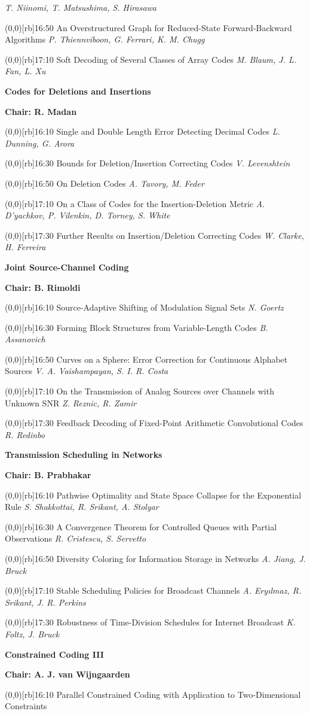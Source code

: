 \documentclass[a5paper,twoside]{article}
\def\sesstitle#1{\vspace{.45\bigskipamount}\par{\bfseries #1}\par}
\def\sesschair#1{{\bfseries Chair: #1}\par\vspace{.65\medskipamount}}
\def\papertime#1{\makebox(0,0)[rb]{{\scriptsize #1}\hspace{.5em}}}
\def\papertitle#1{#1\hfil\break}
\def\paperauthors#1{{\itshape #1}\par\filbreak\vspace{.65\medskipamount}}
\begin{document}
\paperauthors{T. Niinomi, T. Matsushima, S. Hirasawa}
\papertime{16:50}%
\papertitle{An Overstructured Graph for Reduced-State Forward-Backward Algorithms}
\paperauthors{P. Thiennviboon, G. Ferrari, K. M. Chugg}
\papertime{17:10}%
\papertitle{Soft Decoding of Several Classes of Array Codes}
\paperauthors{M. Blaum, J. L. Fan, L. Xu}
\sesstitle{Codes for Deletions and Insertions}
\sesschair{R. Madan}
\papertime{16:10}%
\papertitle{Single and Double Length Error Detecting Decimal Codes}
\paperauthors{L. Dunning, G. Arora}
\papertime{16:30}%
\papertitle{Bounds for Deletion/Insertion Correcting Codes}
\paperauthors{V. Levenshtein}
\papertime{16:50}%
\papertitle{On Deletion Codes}
\paperauthors{A. Tavory, M. Feder}
\papertime{17:10}%
\papertitle{On a Class of Codes for the Insertion-Deletion Metric}
\paperauthors{A. D'yachkov, P. Vilenkin, D. Torney, S. White}
\papertime{17:30}%
\papertitle{Further Results on Insertion/Deletion Correcting Codes}
\paperauthors{W. Clarke, H. Ferreira}
\sesstitle{Joint Source-Channel Coding}
\sesschair{B. Rimoldi}
\papertime{16:10}%
\papertitle{Source-Adaptive Shifting of Modulation Signal Sets}
\paperauthors{N. Goertz}
\papertime{16:30}%
\papertitle{Forming Block Structures from Variable-Length Codes}
\paperauthors{B. Assanovich}
\papertime{16:50}%
\papertitle{Curves on a Sphere: Error Correction for Continuous Alphabet Sources}
\paperauthors{V. A. Vaishampayan, S. I. R. Costa}
\papertime{17:10}%
\papertitle{On the Transmission of Analog Sources over Channels with Unknown SNR}
\paperauthors{Z. Reznic, R. Zamir}
\papertime{17:30}%
\papertitle{Feedback Decoding of Fixed-Point Arithmetic Convolutional Codes}
\paperauthors{R. Redinbo}
\sesstitle{Transmission Scheduling in Networks}
\sesschair{B. Prabhakar}
\papertime{16:10}%
\papertitle{Pathwise Optimality and State Space Collapse for the Exponential Rule}
\paperauthors{S. Shakkottai, R. Srikant, A. Stolyar}
\papertime{16:30}%
\papertitle{A Convergence Theorem for Controlled Queues with Partial Observations}
\paperauthors{R. Cristescu, S. Servetto}
\papertime{16:50}%
\papertitle{Diversity Coloring for Information Storage in Networks}
\paperauthors{A. Jiang, J. Bruck}
\papertime{17:10}%
\papertitle{Stable Scheduling Policies for Broadcast Channels}
\paperauthors{A. Ery{\i}lmaz, R. Srikant, J. R. Perkins}
\papertime{17:30}%
\papertitle{Robustness of Time-Division Schedules for Internet Broadcast}
\paperauthors{K. Foltz, J. Bruck}
\sesstitle{Constrained Coding III}
\sesschair{A. J. van Wijngaarden}
\papertime{16:10}%
\papertitle{Parallel Constrained Coding with Application to Two-Dimensional Constraints}
\end{document}
